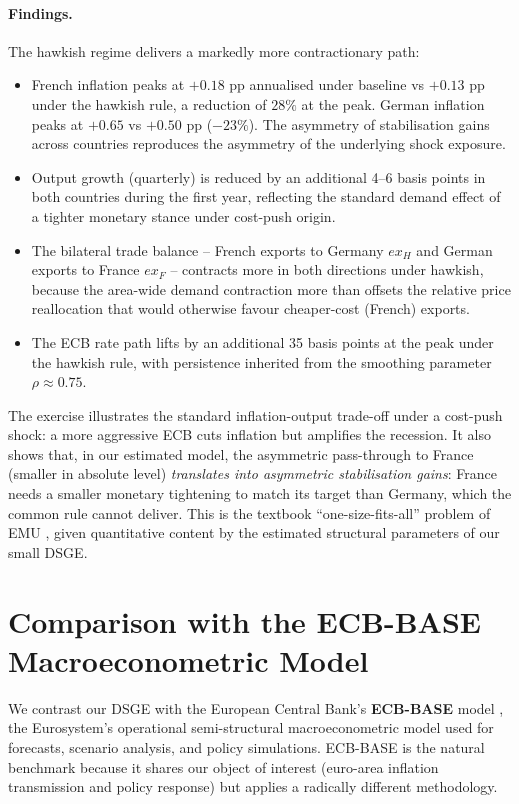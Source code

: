 \documentclass[11pt,a4paper]{article}
\begin{document}
\paragraph{Findings.}
The hawkish regime delivers a markedly more contractionary path:

\begin{itemize}
\item French inflation peaks at $+0.18$ pp annualised under baseline
  vs $+0.13$ pp under the hawkish rule, a reduction of $28\%$ at
  the peak. German inflation peaks at $+0.65$ vs $+0.50$ pp
  ($-23\%$). The asymmetry of stabilisation gains across countries
  reproduces the asymmetry of the underlying shock exposure.
\item Output growth (quarterly) is reduced by an additional 4--6
  basis points in both countries during the first year, reflecting
  the standard demand effect of a tighter monetary stance under
  cost-push origin.
\item The bilateral trade balance -- French exports to Germany
  $ex_H$ and German exports to France $ex_F$ -- contracts more in
  both directions under hawkish, because the area-wide demand
  contraction more than offsets the relative price reallocation
  that would otherwise favour cheaper-cost (French) exports.
\item The ECB rate path lifts by an additional 35 basis points at
  the peak under the hawkish rule, with persistence inherited from
  the smoothing parameter $\rho \approx 0.75$.
\end{itemize}

The exercise illustrates the standard inflation-output trade-off
under a cost-push shock: a more aggressive ECB cuts inflation but
amplifies the recession. It also shows that, in our estimated model,
the asymmetric pass-through to France (smaller in absolute level)
\emph{translates into asymmetric stabilisation gains}: France needs
a smaller monetary tightening to match its target than Germany,
which the common rule cannot deliver. This is the textbook
``one-size-fits-all'' problem of EMU \citep{Kollmann2001}, given
quantitative content by the estimated structural parameters of our
small DSGE.

\section{Comparison with the ECB-BASE Macroeconometric Model}
\label{sec:ecbbase}
We contrast our DSGE with the European Central Bank's
\textbf{ECB-BASE} model \citep{ECBBASE2019}, the Eurosystem's
operational semi-structural macroeconometric model used for
forecasts, scenario analysis, and policy simulations. ECB-BASE is
the natural benchmark because it shares our object of interest
(euro-area inflation transmission and policy response) but applies
a radically different methodology.
\end{document}
